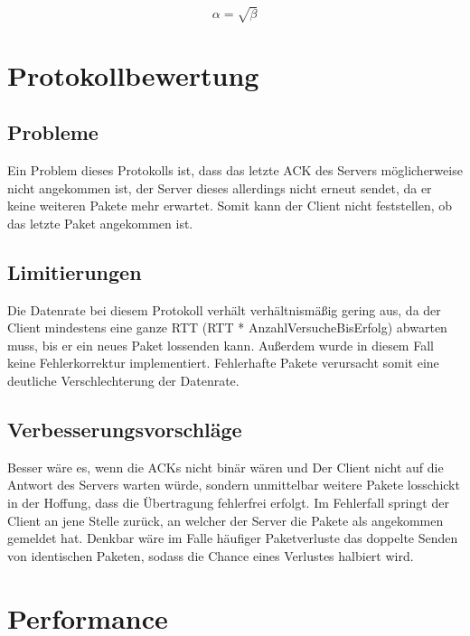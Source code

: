 \documentclass[a4paper,10pt]{article}
\begin{document}
	\begin{equation}
		\label{simple_equation}
		\alpha = \sqrt{ \beta }
	\end{equation}
	
	
	\section{Protokollbewertung}
		
	\subsection{Probleme}
	Ein Problem dieses Protokolls ist, dass das letzte ACK des Servers möglicherweise nicht angekommen ist, der Server dieses allerdings nicht erneut sendet, da er keine weiteren Pakete mehr erwartet. Somit kann der Client nicht feststellen, ob das letzte Paket angekommen ist.
	
	\subsection{Limitierungen}
	Die Datenrate bei diesem Protokoll verhält verhältnismäßig gering aus, da der Client mindestens eine ganze RTT (RTT * AnzahlVersucheBisErfolg) abwarten muss, bis er ein neues Paket lossenden kann. Außerdem wurde in diesem Fall keine Fehlerkorrektur implementiert. Fehlerhafte Pakete verursacht somit eine deutliche Verschlechterung der Datenrate.
	
	\subsection{Verbesserungsvorschläge}
	Besser wäre es, wenn die ACKs nicht binär wären und Der Client nicht auf die Antwort des Servers warten würde, sondern unmittelbar weitere Pakete losschickt in der Hoffung, dass die Übertragung fehlerfrei erfolgt. Im Fehlerfall springt der Client an jene Stelle zurück, an welcher der Server die Pakete als angekommen gemeldet hat. Denkbar wäre im Falle häufiger Paketverluste das doppelte Senden von identischen Paketen, sodass die Chance eines Verlustes halbiert wird.
	
	\section{Performance}
	
\end{document}
